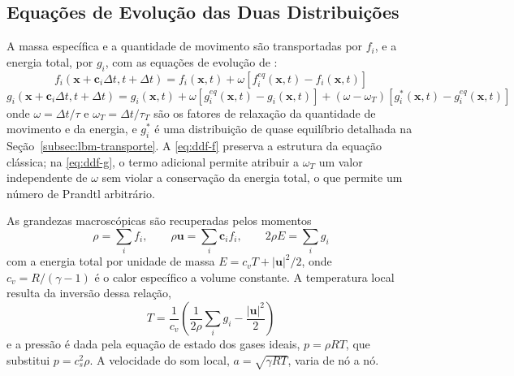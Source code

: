 
\subsection{Equações de Evolução das Duas Distribuições}\label{subsec:lbm-ddf-evolucao}

A massa específica e a quantidade de movimento são transportadas por $f_i$, e a energia total, por $g_i$, com as equações de evolução de \textcite{Tran2022}:
\begin{equation}\label{eq:ddf-f}
    f_i(\mathbf{x} + \mathbf{c}_i \Delta t, t + \Delta t) = f_i(\mathbf{x}, t) + \omega \left[ f_i^{eq}(\mathbf{x}, t) - f_i(\mathbf{x}, t) \right]
\end{equation}
\begin{equation}\label{eq:ddf-g}
    g_i(\mathbf{x} + \mathbf{c}_i \Delta t, t + \Delta t) = g_i(\mathbf{x}, t) + \omega \left[ g_i^{eq}(\mathbf{x}, t) - g_i(\mathbf{x}, t) \right] + (\omega - \omega_T) \left[ g_i^{*}(\mathbf{x}, t) - g_i^{eq}(\mathbf{x}, t) \right]
\end{equation}
onde $\omega = \Delta t/\tau$ e $\omega_T = \Delta t/\tau_T$ são os fatores de relaxação da quantidade de movimento e da energia, e $g_i^{*}$ é uma distribuição de quase equilíbrio detalhada na Seção~\ref{subsec:lbm-transporte}.
A \eqref{eq:ddf-f} preserva a estrutura da equação clássica; na \eqref{eq:ddf-g}, o termo adicional permite atribuir a $\omega_T$ um valor independente de $\omega$ sem violar a conservação da energia total, o que permite um número de Prandtl arbitrário.

As grandezas macroscópicas são recuperadas pelos momentos
\begin{equation}\label{eq:ddf-momentos}
    \rho = \sum_i f_i, \qquad \rho \mathbf{u} = \sum_i \mathbf{c}_i f_i, \qquad 2 \rho E = \sum_i g_i
\end{equation}
com a energia total por unidade de massa $E = c_v T + |\mathbf{u}|^2/2$, onde $c_v = R/(\gamma - 1)$ é o calor específico a volume constante.
A temperatura local resulta da inversão dessa relação,
\begin{equation}\label{eq:temperatura-local}
    T = \frac{1}{c_v} \left( \frac{1}{2\rho} \sum_i g_i - \frac{|\mathbf{u}|^2}{2} \right)
\end{equation}
e a pressão é dada pela equação de estado dos gases ideais, $p = \rho R T$, que substitui $p = c_s^2 \rho$.
A velocidade do som local, $a = \sqrt{\gamma R T}$, varia de nó a nó.

